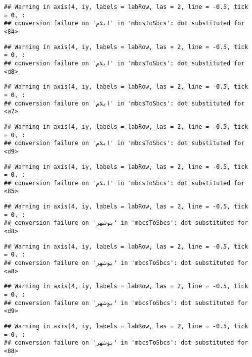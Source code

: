 \documentclass[
]{article}
\begin{document}
\begin{verbatim}
## Warning in axis(4, iy, labels = labRow, las = 2, line = -0.5, tick = 0, :
## conversion failure on 'ایلام' in 'mbcsToSbcs': dot substituted for <84>
\end{verbatim}

\begin{verbatim}
## Warning in axis(4, iy, labels = labRow, las = 2, line = -0.5, tick = 0, :
## conversion failure on 'ایلام' in 'mbcsToSbcs': dot substituted for <d8>
\end{verbatim}

\begin{verbatim}
## Warning in axis(4, iy, labels = labRow, las = 2, line = -0.5, tick = 0, :
## conversion failure on 'ایلام' in 'mbcsToSbcs': dot substituted for <a7>
\end{verbatim}

\begin{verbatim}
## Warning in axis(4, iy, labels = labRow, las = 2, line = -0.5, tick = 0, :
## conversion failure on 'ایلام' in 'mbcsToSbcs': dot substituted for <d9>
\end{verbatim}

\begin{verbatim}
## Warning in axis(4, iy, labels = labRow, las = 2, line = -0.5, tick = 0, :
## conversion failure on 'ایلام' in 'mbcsToSbcs': dot substituted for <85>
\end{verbatim}

\begin{verbatim}
## Warning in axis(4, iy, labels = labRow, las = 2, line = -0.5, tick = 0, :
## conversion failure on 'بوشهر' in 'mbcsToSbcs': dot substituted for <d8>
\end{verbatim}

\begin{verbatim}
## Warning in axis(4, iy, labels = labRow, las = 2, line = -0.5, tick = 0, :
## conversion failure on 'بوشهر' in 'mbcsToSbcs': dot substituted for <a8>
\end{verbatim}

\begin{verbatim}
## Warning in axis(4, iy, labels = labRow, las = 2, line = -0.5, tick = 0, :
## conversion failure on 'بوشهر' in 'mbcsToSbcs': dot substituted for <d9>
\end{verbatim}

\begin{verbatim}
## Warning in axis(4, iy, labels = labRow, las = 2, line = -0.5, tick = 0, :
## conversion failure on 'بوشهر' in 'mbcsToSbcs': dot substituted for <88>
\end{verbatim}
\end{document}
